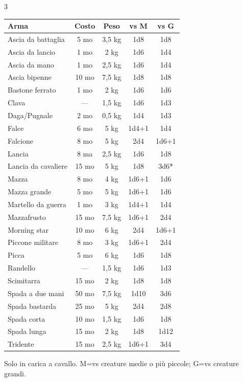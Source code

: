 \documentclass[10pt,a4paper,landscape]{article}
\newcommand{\sectiontitle}[1]{%
	\vspace{3pt}
	\noindent{\normalsize\bfseries #1}
	\vspace{1pt}
}
\begin{document}
	\begin{multicols}{3}

		\sectiontitle{Danni Armi da Mischia}

		\scriptsize
		\noindent
		\begin{tabular}{lcccc}
			\toprule
			\rowcolor{lightgray}
			\textbf{Arma} & \textbf{Costo} & \textbf{Peso} & \textbf{vs M} & \textbf{vs G} \\
			\midrule
			Ascia da battaglia & 5 mo & 3,5 kg & 1d8 & 1d8 \\
			\rowcolor{lightgray}
			Ascia da lancio & 1 mo & 2 kg & 1d6 & 1d4 \\
			Ascia da mano & 1 mo & 2,5 kg & 1d6 & 1d4 \\
			\rowcolor{lightgray}
			Ascia bipenne & 10 mo & 7,5 kg & 1d8 & 1d8 \\
			Bastone ferrato & 1 mo & 2 kg & 1d6 & 1d6 \\
			\rowcolor{lightgray}
			Clava & --- & 1,5 kg & 1d6 & 1d3 \\
			Daga/Pugnale & 2 mo & 0,5 kg & 1d4 & 1d3 \\
			\rowcolor{lightgray}
			Falce & 6 mo & 5 kg & 1d4+1 & 1d4 \\
			Falcione & 8 mo & 5 kg & 2d4 & 1d6+1 \\
			\rowcolor{lightgray}
			Lancia & 8 ma & 2,5 kg & 1d6 & 1d8 \\
			Lancia da cavaliere & 15 mo & 5 kg & 1d8 & 3d6* \\
			\rowcolor{lightgray}
			Mazza & 8 mo & 4 kg & 1d6+1 & 1d6 \\
			Mazza grande & 5 mo & 5 kg & 1d6+1 & 1d6 \\
			\rowcolor{lightgray}
			Martello da guerra & 1 mo & 3 kg & 1d4+1 & 1d4 \\
			Mazzafrusto & 15 mo & 7,5 kg & 1d6+1 & 2d4 \\
			\rowcolor{lightgray}
			Morning star & 10 mo & 6 kg & 2d4 & 1d6+1 \\
			Piccone militare & 8 mo & 3 kg & 1d6+1 & 2d4 \\
			\rowcolor{lightgray}
			Picca & 5 mo & 6 kg & 1d6 & 1d8 \\
			Randello & --- & 1,5 kg & 1d6 & 1d3 \\
			\rowcolor{lightgray}
			Scimitarra & 15 mo & 2 kg & 1d8 & 1d8 \\
			Spada a due mani & 50 mo & 7,5 kg & 1d10 & 3d6 \\
			\rowcolor{lightgray}
			Spada bastarda & 25 mo & 5 kg & 2d4 & 2d8 \\
			Spada corta & 10 mo & 1,5 kg & 1d6 & 1d8 \\
			\rowcolor{lightgray}
			Spada lunga & 15 mo & 2 kg & 1d8 & 1d12 \\
			Tridente & 15 mo & 2,5 kg & 1d6+1 & 3d4 \\
			\bottomrule
		\end{tabular}
		\par
		\noindent\parbox{\linewidth}{\scriptsize *Solo in carica a cavallo. M=vs creature medie o pi\`u piccole; G=vs creature grandi.}


\end{multicols}
\end{document}
